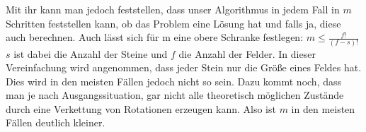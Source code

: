 	Mit ihr kann man jedoch feststellen, dass unser Algorithmus in jedem Fall in \(m\) Schritten feststellen kann, ob das Problem eine Lösung hat und falls ja, diese auch berechnen. 
	Auch lässt sich für m eine obere Schranke festlegen: \(m \le \frac{f!}{(f-s)!}\) \(s\) ist dabei die Anzahl der Steine und \(f\) die Anzahl der Felder. 
	In dieser Vereinfachung wird angenommen, dass jeder Stein nur die Größe eines Feldes hat. Dies wird in den meisten Fällen jedoch nicht so sein.
	Dazu kommt noch, dass man je nach Ausgangssituation, 
	gar nicht alle theoretisch möglichen Zustände durch eine Verkettung von Rotationen erzeugen kann. 
	Also ist \(m\) in den meisten Fällen deutlich kleiner. 

